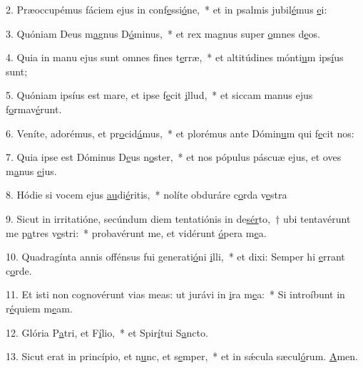 2. Præoccupémus fáciem ejus in conf\uline{e}ssi\uline{ó}ne,~* et in psalmis jubil\uline{é}mus \uline{e}i:\par 
3. Quóniam Deus m\uline{a}gnus D\uline{ó}minus,~* et rex magnus super \uline{o}mnes d\uline{e}os.\par 
4. Quia in manu ejus sunt omnes f\uline{i}nes t\uline{e}rræ,~* et altitúdines mónti\uline{u}m ips\uline{í}us sunt;\par 
5. Quóniam ipsíus est mare, et ipse f\uline{e}cit \uline{i}llud,~* et siccam manus ejus f\uline{o}rmav\uline{é}runt.\par 
6. Veníte, adorémus, et pr\uline{o}cid\uline{á}mus,~* et plorémus ante Dómin\uline{u}m qui f\uline{e}cit nos:\par 
7. Quia ipse est Dóminus D\uline{e}us n\uline{o}ster,~* et nos pópulus páscuæ ejus, et oves m\uline{a}nus \uline{e}jus.\par 
8. Hódie si vocem ejus \uline{au}di\uline{é}ritis,~* nolíte obduráre c\uline{o}rda v\uline{e}stra\par 
9. Sicut in irritatióne, secúndum diem tentatiónis in de\uline{sér}to,~† ubi tentavérunt me p\uline{a}tres v\uline{e}stri:~* probavérunt me, et vidérunt \uline{ó}pera m\uline{e}a.\par 
10. Quadragínta annis offénsus fui generati\uline{ó}ni \uline{i}lli,~* et dixi: Semper hi \uline{e}rrant c\uline{o}rde.\par 
11. Et isti non cognovérunt vias meas: ut jurávi in \uline{i}ra m\uline{e}a:~* Si introíbunt in r\uline{é}quiem m\uline{e}am.\par 
12. Glória P\uline{a}tri, et F\uline{í}lio,~* et Spir\uline{í}tui S\uline{a}ncto.\par 
13. Sicut erat in princípio, et n\uline{u}nc, et s\uline{e}mper,~* et in sǽcula sæcul\uline{ó}rum. \uline{A}men.\par 
